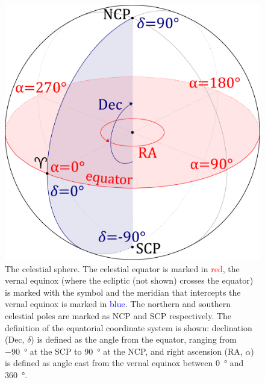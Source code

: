 \begin{colsection}
\begin{colsection}

\begin{figure}[p]
\begin{center}
\includegraphics[width=\linewidth]{images/globe1.pdf}
\end{center}
\caption[The celestial sphere]{The celestial sphere. The celestial equator is marked in \textcolor{red}{red}, the vernal equinox (where the ecliptic (not shown) crosses the equator) is marked with the symbol \Aries{} and the meridian that intercepts the vernal equinox is marked in \textcolor{blue}{blue}. The northern and southern celestial poles are marked as NCP and SCP respectively. The definition of the equatorial coordinate system is shown: declination (Dec, $\delta$) is defined as the angle from the equator, ranging from \SI{-90}{\degree} at the SCP to \SI{90}{\degree} at the NCP, and right ascension (RA, $\alpha$) is defined as angle east from the vernal equinox between \SI{0}{\degree} and \SI{360}{\degree}.
}
\label{fig:sphere}
\end{figure}


\end{colsection}
\end{colsection}
